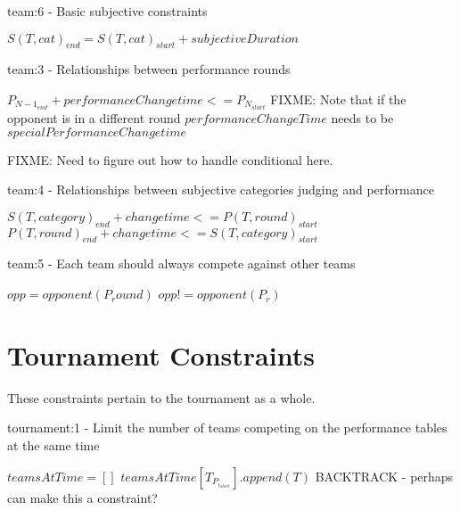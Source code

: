 \documentclass[letterpaper,11pt]{report}
\begin{document}
\begin{algorithm}
\caption{team:6 - Basic subjective constraints}
\begin{algorithmic}
  \STATE $S(T, cat)_{end} = S(T, cat)_{start} + subjectiveDuration$
\ENDFOR
\end{algorithmic}
\end{algorithm}

\begin{algorithm}
\caption{team:3 - Relationships between performance rounds}
\begin{algorithmic}
  \STATE $P_{{N-1}_{end}} + performanceChangetime <= P_{N_{start}}$ \COMMENT FIXME: Note that if the opponent is in a different round $performanceChangeTime$ needs to be $specialPerformanceChangetime$
\ENDFOR
\end{algorithmic}
\end{algorithm}


\FloatBarrier
FIXME: Need to figure out how to handle conditional here.
\begin{algorithm}
\caption{team:4 - Relationships between subjective categories judging and performance}
\begin{algorithmic}
      \STATE $S(T, category)_{end} + changetime <= P(T, round)_{start}$
    \ELSE
      \STATE $P(T, round)_{end} + changetime <= S(T, category)_{start}$
    \ENDIF
  \ENDFOR
\ENDFOR
\end{algorithmic}
\end{algorithm}

\begin{algorithm}
\caption{team:5 - Each team should always compete against other teams}
\begin{algorithmic}
  \STATE $opp = opponent(P_round)$
    \STATE $opp != opponent(P_r)$
  \ENDFOR
\ENDFOR
\end{algorithmic}
\end{algorithm}


\FloatBarrier
\section{Tournament Constraints}
These constraints pertain to the tournament as a whole.

\begin{algorithm}
\caption{tournament:1 - Limit the number of teams competing on the performance tables at
  the same time}
\begin{algorithmic}

\STATE $teamsAtTime = []$
    \STATE $teamsAtTime[T_{P_{i_{start}}}].append(T)$
  \ENDFOR
      \STATE BACKTRACK - perhaps can make this a constraint?
    \ENDIF
  \ENDFOR
\ENDFOR

\end{algorithmic}
\end{algorithm}
\end{document}
